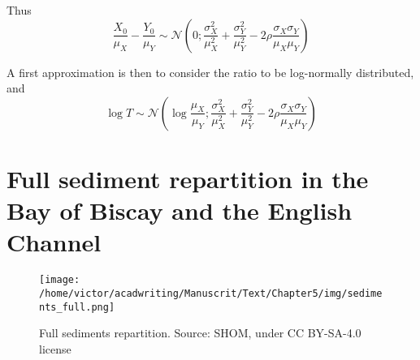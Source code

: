 \documentclass[../../Main_ManuscritThese.tex]{subfiles}
\begin{document}
  Thus
  \begin{equation}
    \frac{X_0}{\mu_X} - \frac{Y_0}{\mu_Y} \sim \mathcal{N}\left(0;\frac{\sigma^2_X}{\mu_X^2} + \frac{\sigma^2_Y}{\mu_Y^2} - 2 \rho \frac{\sigma_X \sigma_Y}{\mu_X \mu_Y} \right)
  \end{equation}
  
  A first approximation is then to consider the ratio to be log-normally distributed, and
  \begin{equation}
    \log T \sim \mathcal{N}\left(\log \frac{\mu_X}{\mu_Y}; \frac{\sigma^2_X}{\mu_X^2} + \frac{\sigma^2_Y}{\mu_Y^2} - 2 \rho \frac{\sigma_X \sigma_Y}{\mu_X \mu_Y} \right)
  \end{equation}
  


\newpage
\section{Full sediment repartition in the Bay of Biscay and the English Channel}
 \label{sec:sediments_full}
\begin{figure}[ht]
  \centering
  \texttt{[image: /home/victor/acadwriting/Manuscrit/Text/Chapter5/img/sediments\_full.png]}
  \caption{\label{fig:sediments_full} Full sediments
    repartition. Source: SHOM, under CC BY-SA-4.0 license}
\end{figure}
\end{document}
